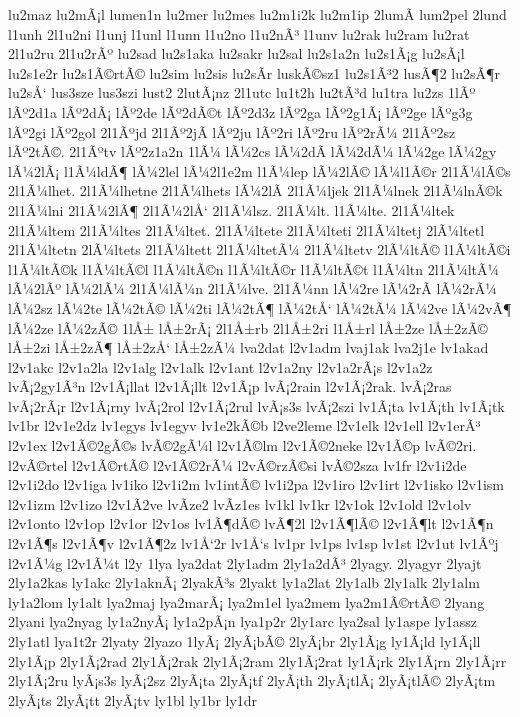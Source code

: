 {lu2maz
lu2mÃ¡l
lumen1n
lu2mer
lu2mes
lu2m1i2k
lu2m1ip
2lumÃ­
lum2pel
2lund
l1unh
2l1u2ni
l1unj
l1unl
l1unn
l1u2no
l1u2nÃ³
l1unv
lu2rak
lu2ram
lu2rat
2l1u2ru
2l1u2rÃº
lu2sad
lu2s1aka
lu2sakr
lu2sal
lu2s1a2n
lu2s1Ã¡g
lu2sÃ¡l
lu2s1e2r
lu2s1Ã©rtÃ©
lu2sim
lu2sis
lu2sÃ­r
luskÃ©sz1
lu2s1Ã³2
lusÃ¶2
lu2sÃ¶r
lu2sÅ‘
lus3sze
lus3szi
lust2
2lutÃ¡nz
2l1utc
lu1t2h
lu2tÃ³d
lu1tra
lu2zs
1lÃº
lÃº2d1a
lÃº2dÃ¡
lÃº2de
lÃº2dÃ©t
lÃº2d3z
lÃº2ga
lÃº2g1Ã¡
lÃº2ge
lÃºg3g
lÃº2gi
lÃº2gol
2l1Ãºjd
2l1Ãº2jÃ­
lÃº2ju
lÃº2ri
lÃº2ru
lÃº2rÃ¼
2l1Ãº2sz
lÃº2tÃ©.
2l1Ãºtv
lÃº2z1a2n
1lÃ¼
lÃ¼2cs
lÃ¼2dÃ­
lÃ¼2dÃ¼
lÃ¼2ge
lÃ¼2gy
lÃ¼2lÃ¡
l1Ã¼ldÃ¶
lÃ¼2lel
lÃ¼2l1e2m
l1Ã¼lep
lÃ¼2lÃ©
lÃ¼l1Ã©r
2l1Ã¼lÃ©s
2l1Ã¼lhet.
2l1Ã¼lhetne
2l1Ã¼lhets
lÃ¼2lÃ­
2l1Ã¼ljek
2l1Ã¼lnek
2l1Ã¼lnÃ©k
2l1Ã¼lni
2l1Ã¼2lÃ¶
2l1Ã¼2lÅ‘
2l1Ã¼lsz.
2l1Ã¼lt.
l1Ã¼lte.
2l1Ã¼ltek
2l1Ã¼ltem
2l1Ã¼ltes
2l1Ã¼ltet.
2l1Ã¼ltete
2l1Ã¼lteti
2l1Ã¼ltetj
2lÃ¼ltetl
2l1Ã¼ltetn
2lÃ¼ltets
2l1Ã¼ltett
2l1Ã¼ltetÃ¼
2l1Ã¼ltetv
2lÃ¼ltÃ©
l1Ã¼ltÃ©i
l1Ã¼ltÃ©k
l1Ã¼ltÃ©l
l1Ã¼ltÃ©n
l1Ã¼ltÃ©r
l1Ã¼ltÃ©t
l1Ã¼ltn
2l1Ã¼ltÃ¼
lÃ¼2lÃº
lÃ¼2lÃ¼
2l1Ã¼lÃ¼n
2l1Ã¼lve.
2l1Ã¼nn
lÃ¼2re
lÃ¼2rÃ­
lÃ¼2rÃ¼
lÃ¼2sz
lÃ¼2te
lÃ¼2tÃ©
lÃ¼2ti
lÃ¼2tÃ¶
lÃ¼2tÅ‘
lÃ¼2tÃ¼
lÃ¼2ve
lÃ¼2vÃ¶
lÃ¼2ze
lÃ¼2zÃ©
1lÅ±
lÅ±2rÃ¡
2l1Å±rb
2l1Å±2ri
l1Å±rl
lÅ±2ze
lÅ±2zÃ©
lÅ±2zi
lÅ±2zÃ¶
lÅ±2zÅ‘
lÅ±2zÃ¼
lva2dat
l2v1adm
lvaj1ak
lva2j1e
lv1akad
l2v1akc
l2v1a2la
l2v1alg
l2v1alk
l2v1ant
l2v1a2ny
l2v1a2rÃ¡s
l2v1a2z
lvÃ¡2gy1Ã³n
l2v1Ã¡llat
l2v1Ã¡llt
l2v1Ã¡p
lvÃ¡2rain
l2v1Ã¡2rak.
lvÃ¡2ras
lvÃ¡2rÃ¡r
l2v1Ã¡rny
lvÃ¡2rol
l2v1Ã¡2rul
lvÃ¡s3s
lvÃ¡2szi
lv1Ã¡ta
lv1Ã¡th
lv1Ã¡tk
lv1br
l2v1e2dz
lv1egys
lv1egyv
lv1e2kÃ©b
l2ve2leme
l2v1elk
l2v1ell
l2v1erÃ³
l2v1ex
l2v1Ã©2gÃ©s
lvÃ©2gÃ¼l
l2v1Ã©lm
l2v1Ã©2neke
l2v1Ã©p
lvÃ©2ri.
l2vÃ©rtel
l2v1Ã©rtÃ©
l2v1Ã©2rÃ¼
l2vÃ©rzÃ©si
lvÃ©2sza
lv1fr
l2v1i2de
l2v1i2do
l2v1iga
lv1iko
l2v1i2m
lv1intÃ©
lv1i2pa
l2v1iro
l2v1irt
l2v1isko
l2v1ism
l2v1izm
l2v1izo
l2v1Ã­2ve
lvÃ­ze2
lvÃ­z1es
lv1kl
lv1kr
l2v1ok
l2v1old
l2v1olv
l2v1onto
l2v1op
l2v1or
l2v1os
lv1Ã¶dÃ©
lvÃ¶2l
l2v1Ã¶lÃ©
l2v1Ã¶lt
l2v1Ã¶n
l2v1Ã¶s
l2v1Ã¶v
l2v1Ã¶2z
lv1Å‘2r
lv1Å‘s
lv1pr
lv1ps
lv1sp
lv1st
l2v1ut
lv1Ãºj
l2v1Ã¼g
l2v1Ã¼t
l2y
1lya
lya2dat
2ly1adm
2ly1a2dÃ³
2lyagy.
2lyagyr
2lyajt
2ly1a2kas
ly1akc
2ly1aknÃ¡
2lyakÃ³s
2lyakt
ly1a2lat
2ly1alb
2ly1alk
2ly1alm
ly1a2lom
ly1alt
lya2maj
lya2marÃ¡
lya2m1el
lya2mem
lya2m1Ã©rtÃ©
2lyang
2lyani
lya2nyag
ly1a2nyÃ¡
ly1a2pÃ¡n
lya1p2r
2ly1arc
lya2sal
ly1aspe
ly1assz
2ly1atl
lya1t2r
2lyaty
2lyazo
1lyÃ¡
2lyÃ¡bÃ©
2lyÃ¡br
2ly1Ã¡g
ly1Ã¡ld
ly1Ã¡ll
2ly1Ã¡p
2ly1Ã¡2rad
2ly1Ã¡2rak
2ly1Ã¡2ram
2ly1Ã¡2rat
ly1Ã¡rk
2ly1Ã¡rn
2ly1Ã¡rr
2ly1Ã¡2ru
lyÃ¡s3s
lyÃ¡2sz
2lyÃ¡ta
2lyÃ¡tf
2lyÃ¡th
2lyÃ¡tlÃ¡
2lyÃ¡tlÃ©
2lyÃ¡tm
2lyÃ¡ts
2lyÃ¡tt
2lyÃ¡tv
ly1bl
ly1br
ly1dr
}
